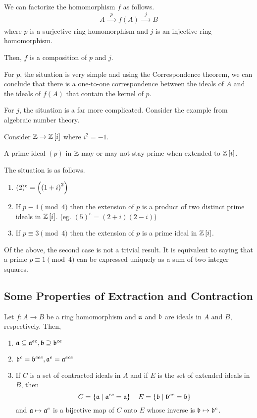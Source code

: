 We can factorize the homomorphism \(f\) as follows.
\[
	A \xrightarrow[\quad\quad]{p} f(A) \xrightarrow[\quad\quad]{j} B
\]
where \(p\) is a surjective ring homomorphism and \(j\) is an injective
ring homomorphism.

Then, \(f\) is a composition of \(p\) and \(j\).


For \(p\), the situation is very simple and using the Correspondence
theorem, we can conclude that there is a one-to-one correspondence between
the ideals of \(A\) and the ideals of \(f(A)\) that contain
the kernel of \(p\).

For \(j\), the situation is a far more complicated.
Consider the example from algebraic number theory.

\begin{example}{}{}
	Consider \(\ZZ \to \ZZ\sbrak{i}\) where \(i^2 = -1\).

	A prime ideal \((p)\) in \(\ZZ\) may or may not stay prime when
	extended to \(\ZZ\sbrak{i}\).

	The situation is as follows.
	\begin{enumerate}
		\item \((2)^e = \left( \left( 1+i \right)^2 \right)\)
		\item If \(p \equiv 1 \pmod{4}\) then the extension of \(p\) is
			a product of two distinct prime ideals in \(\ZZ\sbrak{i}\).
			(eg. \((5)^e = (2+i)(2-i)\))
		\item If \(p \equiv 3 \pmod{4}\) then the extension of \(p\) is
			a prime ideal in \(\ZZ\sbrak{i}\).
	\end{enumerate}
\end{example}
Of the above, the second case is not a trivial result.
It is equivalent to saying that a prime \(p \equiv 1 \pmod{4}\) can be
expressed uniquely as a sum of two integer squares.


\subsection{Some Properties of Extraction and Contraction}

\begin{proposition}{}{}
	Let \(f\colon A \to B\) be a ring homomorphism
	and \(\mathfrak{a}\) and \(\mathfrak{b}\) are ideals in \(A\) and \(B\), respectively.
	Then,
	\begin{enumerate}
		\item \(\mathfrak{a} \subseteq \mathfrak{a}^{ec}, \mathfrak{b} \supseteq \mathfrak{b}^{ce}\)
		\item \(\mathfrak{b}^{c} = \mathfrak{b}^{cec}, \mathfrak{a}^{e} = \mathfrak{a}^{ece}\)
		\item If \(C\) is a set of contracted ideals in \(A\) and if
		\(E\) is the set of extended ideals in \(B\), then
		\[
			C = \left\{ \mathfrak{a} \mid \mathfrak{a}^{ec} = \mathfrak{a} \right\}
			\quad E = \left\{ \mathfrak{b} \mid \mathfrak{b}^{ce} = \mathfrak{b} \right\}
		\]
		and \(\mathfrak{a} \mapsto \mathfrak{a}^e\) is a bijective map of \(C\) onto \(E\)
		whose inverse is \(\mathfrak{b} \mapsto \mathfrak{b}^c\).
	\end{enumerate}
\end{proposition}

